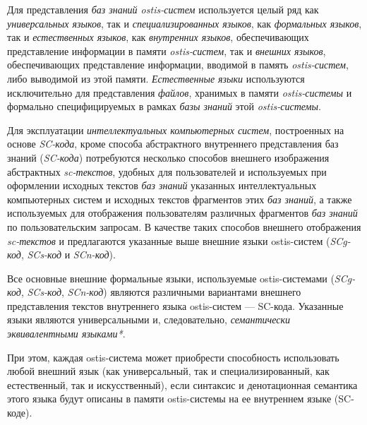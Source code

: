 Для представления \textit{баз знаний ostis-систем} используется целый ряд как \textit{универсальных языков}, так и \textit{специализированных языков}, как \textit{формальных языков}, так и \textit{естественных языков}, как \textit{внутренних языков}, обеспечивающих представление информации в памяти \textit{ostis-систем}, так и \textit{внешних языков}, обеспечивающих представление информации, вводимой в память \textit{ostis-систем}, либо выводимой из этой памяти. \textit{Естественные языки} используются исключительно для представления \textit{файлов}, хранимых в памяти \textit{ostis-системы} и формально специфицируемых в рамках \textit{базы знаний} этой \textit{ostis-системы}.

Для эксплуатации \textit{интеллектуальных компьютерных систем}, построенных на основе \textit{SC-кода}, кроме способа абстрактного внутреннего представления баз знаний (\textit{SC-кода}) потребуются несколько способов внешнего изображения абстрактных \textit{sc-текстов}, удобных для пользователей и используемых при оформлении исходных текстов \textit{баз знаний} указанных интеллектуальных компьютерных систем и исходных текстов фрагментов этих \textit{баз знаний}, а также используемых для отображения пользователям различных фрагментов \textit{баз знаний} по пользовательским запросам.
В качестве таких способов внешнего отображения \textit{sc-текстов} и предлагаются указанные выше внешние языки ostis-систем (\textit{SCg-код}, \textit{SCs-код} и  \textit{SCn-код}).


Все основные внешние формальные языки, используемые ostis-системами (\textit{SCg-код}, \textit{SCs-код}, \textit{SCn-код}) являются различными вариантами внешнего представления текстов внутреннего языка ostis-систем --- SC-кода.
Указанные языки являются универсальными и, следовательно, \textit{семантически эквивалентными языками*}.

При этом, каждая ostis-система может приобрести способность использовать любой внешний язык (как универсальный, так и специализированный, как естественный, так и искусственный), если синтаксис и денотационная семантика этого языка будут описаны в памяти ostis-системы на ее внутреннем языке (SC-коде).

